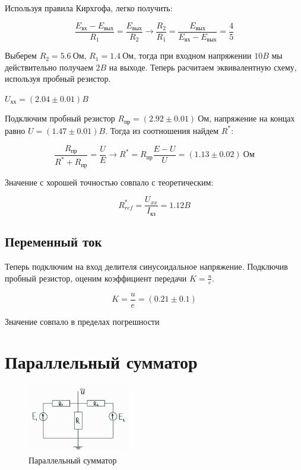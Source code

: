\documentclass[a4paper]{article}
\begin{document}
Используя правила Кирхгофа, легко получить:

\begin{equation}
    \frac{E_\text{вх} - E_\text{вых}}{R_1} = \frac{E_\text{вых}}{R_2} \longrightarrow \frac{R_2}{R_1} = \frac{E_\text{вых}}{E_\text{вх} - E_\text{вых}} = \frac{4}{5}
\end{equation}

Выберем $R_2 = 5.6 \ \text{Ом}$, $R_1 = 1.4 \ \text{Ом}$,
тогда при входном напряжении $10B$ мы действительно получаем $2B$ на выходе.
Теперь расчитаем эквивалентную схему, используя пробный резистор.

$U_\text{хх} = (2.04 \pm 0.01)B$

Подключим пробный резистор $R_\text{пр} = (2.92 \pm 0.01)\ \text{Ом}$,
напряжение на концах равно $U = (1.47 \pm 0.01)B$. Тогда из соотношения найдем $R^*$:

\begin{equation}
    \frac{R_\text{пр}}{R^* + R_\text{пр}} = \frac{U}{E} \longrightarrow R^* = R_\text{пр} \frac{E - U}{U} = (1.13 \pm 0.02) \ \text{Ом}
\end{equation}

Значение с хорошей точностью совпало с теоретическим:

\begin{equation}
    R^*_{ref} = \frac{U_{xx}}{I_\text{кз}} = 1.12B
\end{equation}

\subsection{Переменный ток}

Теперь подключим на вход делителя синусоидальное напряжение.
Подключив пробный резистор, оценим коэффициент передачи $K = \frac{u}{e}$.

\begin{equation}
    K = \frac{u}{e} = (0.21 \pm 0.1)
\end{equation}

Значение совпало в пределах погрешности

\section{Параллельный сумматор}

\begin{figure}
    \includegraphics[width = 0.40\textwidth]{summator.png}
    \caption[width = 0.90\textwidth]{Параллельный сумматор}
\end{figure}
\end{document}

